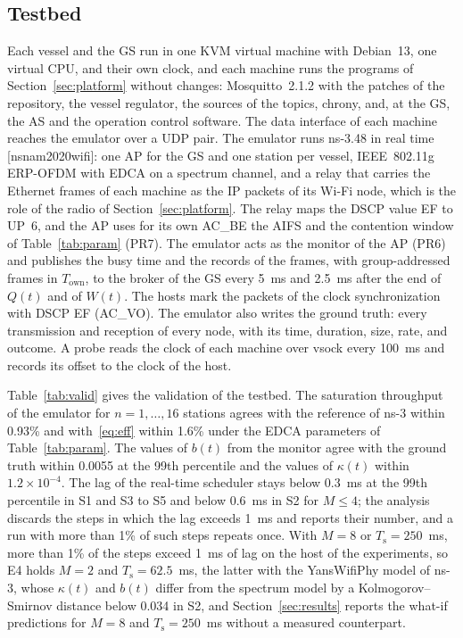 \subsection{Testbed}\label{subsec:testbed}

Each vessel and the GS run in one KVM virtual machine with Debian~13, one virtual CPU, and their own clock, and each machine runs the programs of Section~\ref{sec:platform} without changes: Mosquitto~2.1.2 with the patches of the repository, the vessel regulator, the sources of the topics, chrony, and, at the GS, the AS and the operation control software. The data interface of each machine reaches the emulator over a UDP pair. The emulator runs ns-3.48 in real time [nsnam2020wifi]: one AP for the GS and one station per vessel, IEEE~802.11g ERP-OFDM with EDCA on a spectrum channel, and a relay that carries the Ethernet frames of each machine as the IP packets of its Wi-Fi node, which is the role of the radio of Section~\ref{sec:platform}. The relay maps the DSCP value EF to UP~6, and the AP uses for its own AC\_BE the AIFS and the contention window of Table~\ref{tab:param} (PR7). The emulator acts as the monitor of the AP (PR6) and publishes the busy time and the records of the frames, with group-addressed frames in $T_{\mathrm{own}}$, to the broker of the GS every 5~ms and 2.5~ms after the end of $Q(t)$ and of $W(t)$. The hosts mark the packets of the clock synchronization with DSCP EF (AC\_VO). The emulator also writes the ground truth: every transmission and reception of every node, with its time, duration, size, rate, and outcome. A probe reads the clock of each machine over vsock every 100~ms and records its offset to the clock of the host.

Table~\ref{tab:valid} gives the validation of the testbed. The saturation throughput of the emulator for $n = 1, \dots, 16$ stations agrees with the reference of ns-3 within 0.93\% and with~\eqref{eq:eff} within 1.6\% under the EDCA parameters of Table~\ref{tab:param}. The values of $b(t)$ from the monitor agree with the ground truth within 0.0055 at the 99th percentile and the values of $\kappa(t)$ within $1.2 \times 10^{-4}$. The lag of the real-time scheduler stays below 0.3~ms at the 99th percentile in S1 and S3 to S5 and below 0.6~ms in S2 for $M \leq 4$; the analysis discards the steps in which the lag exceeds 1~ms and reports their number, and a run with more than 1\% of such steps repeats once. With $M = 8$ or $T_{\mathrm{s}} = 250$~ms, more than 1\% of the steps exceed 1~ms of lag on the host of the experiments, so E4 holds $M = 2$ and $T_{\mathrm{s}} = 62.5$~ms, the latter with the YansWifiPhy model of ns-3, whose $\kappa(t)$ and $b(t)$ differ from the spectrum model by a Kolmogorov--Smirnov distance below 0.034 in S2, and Section~\ref{sec:results} reports the what-if predictions for $M = 8$ and $T_{\mathrm{s}} = 250$~ms without a measured counterpart.


